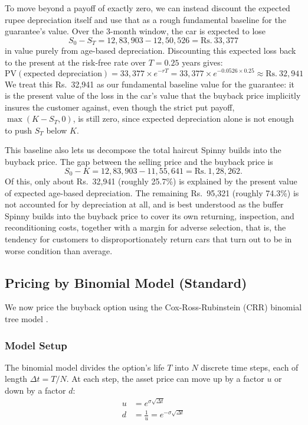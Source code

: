 \documentclass[11pt, a4paper]{article}
\begin{document}
To move beyond a payoff of exactly zero, we can instead discount the expected rupee depreciation itself and use that as a rough fundamental baseline for the guarantee's value. Over the 3-month window, the car is expected to lose
\[
S_0 - S_T = 12{,}83{,}903 - 12{,}50{,}526 = \text{Rs.}~33{,}377
\]
in value purely from age-based depreciation. Discounting this expected loss back to the present at the risk-free rate over $T = 0.25$ years gives:
\[
\text{PV}(\text{expected depreciation}) = 33{,}377 \times e^{-rT} = 33{,}377 \times e^{-0.0526 \times 0.25} \approx \text{Rs.}~32{,}941
\]
We treat this Rs.~32,941 as our fundamental baseline value for the guarantee: it is the present value of the loss in the car's value that the buyback price implicitly insures the customer against, even though the strict put payoff, $\max(K - S_T, 0)$, is still zero, since expected depreciation alone is not enough to push $S_T$ below $K$.

This baseline also lets us decompose the total haircut Spinny builds into the buyback price. The gap between the selling price and the buyback price is
\[
S_0 - K = 12{,}83{,}903 - 11{,}55{,}641 = \text{Rs.}~1{,}28{,}262.
\]
Of this, only about Rs.~32,941 (roughly 25.7\%) is explained by the present value of expected age-based depreciation. The remaining Rs.~95,321 (roughly 74.3\%) is not accounted for by depreciation at all, and is best understood as the buffer Spinny builds into the buyback price to cover its own returning, inspection, and reconditioning costs, together with a margin for adverse selection, that is, the tendency for customers to disproportionately return cars that turn out to be in worse condition than average.



\subsection{Pricing by Binomial Model (Standard)}
\label{sec:pricing_binomial_std}

We now price the buyback option using the Cox-Ross-Rubinstein (CRR) binomial tree model \cite{crr1979}.

\subsubsection{Model Setup}

The binomial model divides the option's life $T$ into $N$ discrete time steps, each of length $\Delta t = T/N$. At each step, the asset price can move up by a factor $u$ or down by a factor $d$:
\begin{align}
    u &= e^{\sigma \sqrt{\Delta t}} \\
    d &= \frac{1}{u} = e^{-\sigma \sqrt{\Delta t}}
\end{align}
\end{document}
